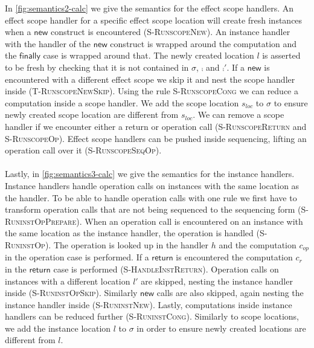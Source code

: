 {In \cref{fig:semantics2-calc} we give the semantics for the effect scope handlers.
An effect scope handler for a specific effect scope location will create fresh instances when a $\mathsf{new}$ construct is encountered (\textsc{S-RunscopeNew}).
An instance handler with the handler of the $\mathsf{new}$ construct is wrapped around the computation and the $\mathsf{finally}$ case is wrapped around that.
The newly created location $l$ is asserted to be fresh by checking that it is not contained in $\sigma$, $\comp$ and $\comp'$.
If a $\mathsf{new}$ is encountered with a different effect scope we skip it and nest the scope handler inside (\textsc{T-RunscopeNewSkip}).
Using the rule \textsc{S-RunscopeCong} we can reduce a computation inside a scope handler.
We add the scope location $s_{loc}$ to $\sigma$ to ensure newly created scope location are different from $s_{loc}$.
We can remove a scope handler if we encounter either a return or operation call (\textsc{S-RunscopeReturn} and \textsc{S-RunscopeOp}).
Effect scope handlers can be pushed inside sequencing, lifting an operation call over it (\textsc{S-RunscopeSeqOp}).
\\\\
Lastly, in \cref{fig:semantics3-calc} we give the semantics for the instance handlers.
Instance handlers handle operation calls on instances with the same location as the handler.
To be able to handle operation calls with one rule we first have to transform operation calls that are not being sequenced to the sequencing form (\textsc{S-RuninstOpPrepare}).
When an operation call is encountered on an instance with the same location as the instance handler, the operation is handled (\textsc{S-RuninstOp}).
The operation is looked up in the handler $h$ and the computation $c_{op}$ in the operation case is performed.
If a $\mathsf{return}$ is encountered the computation $c_r$ in the $\mathsf{return}$ case is performed (\textsc{S-HandleInstReturn}).
Operation calls on instances with a different location $l'$ are skipped, nesting the instance handler inside (\textsc{S-RuninstOpSkip}).
Similarly $\mathsf{new}$ calls are also skipped, again nesting the instance handler inside (\textsc{S-RuninstNew}).
Lastly, computations inside instance handlers can be reduced further (\textsc{S-RuninstCong}).
Similarly to scope locations, we add the instance location $l$ to $\sigma$ in order to ensure newly created locations are different from $l$.

}
